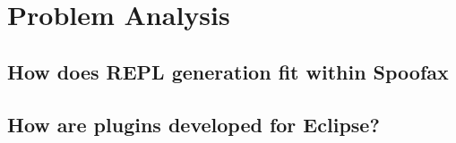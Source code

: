 \section{Problem Analysis}
\label{sec:problem-analysis}

\subsection{How does REPL generation fit within Spoofax}
\label{ssec:architecture}

\subsection{How are plugins developed for Eclipse?}
\label{ssec:eclipse-plugins}

